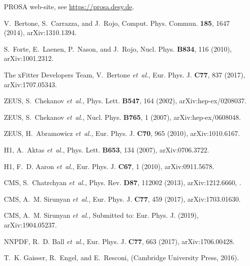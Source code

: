 \documentclass[12pt]{article}
\begin{document}
\begin{thebibliography}{99}
{PROSA} web-site,
\newblock see \url{https://prosa.desy.de}.

V.~Bertone, S.~Carrazza, and J.~Rojo,
\newblock Comput. Phys. Commun. {\bf 185}, 1647 (2014), arXiv:1310.1394.

S.~Forte, E.~Laenen, P.~Nason, and J.~Rojo,
\newblock Nucl. Phys. {\bf B834}, 116 (2010), arXiv:1001.2312.

The xFitter Developers Team, V.~Bertone {\em et~al.},
\newblock Eur. Phys. J. {\bf C77}, 837 (2017), arXiv:1707.05343.

ZEUS, S.~Chekanov {\em et~al.},
\newblock Phys. Lett. {\bf B547}, 164 (2002), arXiv:hep-ex/0208037.

ZEUS, S.~Chekanov {\em et~al.},
\newblock Nucl. Phys. {\bf B765}, 1 (2007), arXiv:hep-ex/0608048.

ZEUS, H.~Abramowicz {\em et~al.},
\newblock Eur. Phys. J. {\bf C70}, 965 (2010), arXiv:1010.6167.

H1, A.~Aktas {\em et~al.},
\newblock Phys. Lett. {\bf B653}, 134 (2007), arXiv:0706.3722.

H1, F.~D. Aaron {\em et~al.},
\newblock Eur. Phys. J. {\bf C67}, 1 (2010), arXiv:0911.5678.

CMS, S.~Chatrchyan {\em et~al.},
\newblock Phys. Rev. {\bf D87}, 112002 (2013), arXiv:1212.6660,
.

CMS, A.~M. Sirunyan {\em et~al.},
\newblock Eur. Phys. J. {\bf C77}, 459 (2017), arXiv:1703.01630.

CMS, A.~M. Sirunyan {\em et~al.},
\newblock Submitted to: Eur. Phys. J.  (2019), arXiv:1904.05237.

NNPDF, R.~D. Ball {\em et~al.},
\newblock Eur. Phys. J. {\bf C77}, 663 (2017), arXiv:1706.00428.

T.~K. Gaisser, R.~Engel, and E.~Resconi,
 (Cambridge University Press,
  2016).


\end{thebibliography}
\end{document}

